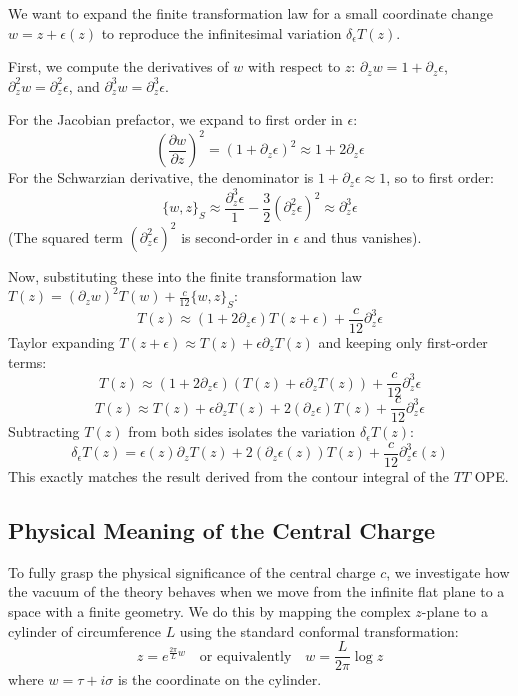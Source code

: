 \begin{example}
    We want to expand the finite transformation law for a small coordinate change \(w = z + \epsilon(z)\) to reproduce the infinitesimal variation \(\delta_\epsilon T(z)\).

    First, we compute the derivatives of \(w\) with respect to \(z\):
    \(\partial_z w = 1 + \partial_z \epsilon\), \(\partial_z^2 w = \partial_z^2 \epsilon\), and \(\partial_z^3 w = \partial_z^3 \epsilon\).

    For the Jacobian prefactor, we expand to first order in \(\epsilon\):
    \[
        \left(\frac{\partial w}{\partial z}\right)^2 = (1 + \partial_z \epsilon)^2 \approx 1 + 2\partial_z \epsilon
    \]
    For the Schwarzian derivative, the denominator is \(1 + \partial_z \epsilon \approx 1\), so to first order:
    \[
        \{w, z\}_S \approx \frac{\partial_z^3 \epsilon}{1} - \frac{3}{2} (\partial_z^2 \epsilon)^2 \approx \partial_z^3 \epsilon
    \]
    (The squared term \((\partial_z^2 \epsilon)^2\) is second-order in \(\epsilon\) and thus vanishes).

    Now, substituting these into the finite transformation law \(T(z) = (\partial_z w)^2 T(w) + \frac{c}{12} \{w, z\}_S\):
    \[
        T(z) \approx (1 + 2\partial_z \epsilon) T(z + \epsilon) + \frac{c}{12} \partial_z^3 \epsilon
    \]
    Taylor expanding \(T(z + \epsilon) \approx T(z) + \epsilon \partial_z T(z)\) and keeping only first-order terms:
    \[
        T(z) \approx (1 + 2\partial_z \epsilon) (T(z) + \epsilon \partial_z T(z)) + \frac{c}{12} \partial_z^3 \epsilon
    \]
    \[
        T(z) \approx T(z) + \epsilon \partial_z T(z) + 2(\partial_z \epsilon)T(z) + \frac{c}{12} \partial_z^3 \epsilon
    \]
    Subtracting \(T(z)\) from both sides isolates the variation \(\delta_\epsilon T(z)\):
    \[
        \delta_\epsilon T(z) = \epsilon(z) \partial_z T(z) + 2(\partial_z \epsilon(z)) T(z) + \frac{c}{12} \partial_z^3 \epsilon(z)
    \]
    This exactly matches the result derived from the contour integral of the \(TT\) OPE.
\end{example}

\subsection{Physical Meaning of the Central Charge}

To fully grasp the physical significance of the central charge \(c\), we investigate how the vacuum of the theory behaves when we move from the infinite flat plane to a space with a finite geometry. We do this by mapping the complex \(z\)-plane to a cylinder of circumference \(L\) using the standard conformal transformation:
\[
    z = e^{\frac{2\pi}{L}w} \quad \text{or equivalently} \quad w = \frac{L}{2\pi} \log z
\]
where \(w = \tau + i\sigma\) is the coordinate on the cylinder.

